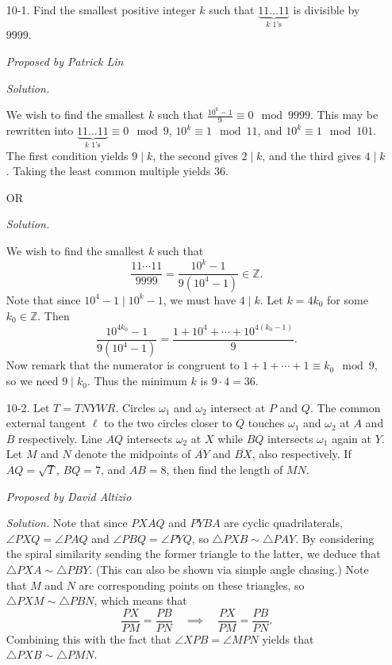\documentclass[10pt]{article}
\newcommand{\proposed}[1]
{
\vspace{5pt}
\noindent\textit{Proposed by #1}
}
\newcommand{\solution}
{
\vspace{5pt}
\noindent\textit{Solution.}\qquad
}
\begin{document}
\begin{enumerate}
\item[10-1.] Find the smallest positive integer $k$ such that $\underbrace{11\dots11}_{\text{$k$ 1's}}$ is divisible by 9999.

\proposed{Patrick Lin}

\solution
We wish to find the smallest $k$ such that $\frac{10^k-1}{9} \equiv 0 \mod{9999}$. This may be rewritten into $\underbrace{11\dots11}_{\text{$k$ 1's}} \equiv 0 \mod 9$, $10^k \equiv 1 \mod 11$, and $10^k \equiv 1 \mod 101$. The first condition yields $9 \mid k$, the second gives $2 \mid k$, and the third gives $4 \mid k$. Taking the least common multiple yields $\boxed{36}$.

\begin{center}OR\end{center}

\solution
We wish to find the smallest $k$ such that \[\frac{11\cdots 11}{9999} = \frac{10^k - 1}{9(10^4 - 1)}\in\mathbb Z.\] Note that since $10^4 - 1\mid 10^k - 1$, we must have $4\mid k$.  Let $k=4k_0$ for some $k_0\in\mathbb Z$.  Then \[\frac{10^{4k_0} - 1}{9(10^4 - 1)} = \frac{1 + 10^4 + \cdots + 10^{4(k_0 - 1)}}9.\] Now remark that the numerator is congruent to $1+1+\cdots + 1 \equiv k_0 \mod 9$, so we need $9\mid k_0$.  Thus the minimum $k$ is $9\cdot 4 = \boxed{36}$.


\item[10-2.] Let $T = TNYWR$. Circles $\omega_1$ and $\omega_2$ intersect at $P$ and $Q$.  The common external tangent $\ell$ to the two circles closer to $Q$ touches $\omega_1$ and $\omega_2$ at $A$ and $B$ respectively.  Line $AQ$ intersects $\omega_2$ at $X$ while $BQ$ intersects $\omega_1$ again at $Y$.  Let $M$ and $N$ denote the midpoints of $\overline{AY}$ and $\overline{BX}$, also respectively.  If $AQ=\sqrt{T}$, $BQ=7$, and $AB=8$, then find the length of $MN$.

\proposed{David Altizio}

\solution Note that since $PXAQ$ and $PYBA$ are cyclic quadrilaterals, $\angle PXQ=\angle PAQ$ and $\angle PBQ=\angle PYQ$, so $\triangle PXB\sim\triangle PAY$.  By considering the spiral similarity sending the former triangle to the latter, we deduce that $\triangle PXA\sim\triangle PBY$.  (This can also be shown via simple angle chasing.)  Note that $M$ and $N$ are corresponding points on these triangles, so $\triangle PXM\sim\triangle PBN$, which means that \[\frac{PX}{PM}=\frac{PB}{PN}\quad\implies \quad \frac{PX}{PM}=\frac{PB}{PN}.\]  Combining this with the fact that $\angle XPB=\angle MPN$ yields that $\triangle PXB\sim\triangle PMN$.


\end{enumerate}
\end{document}

